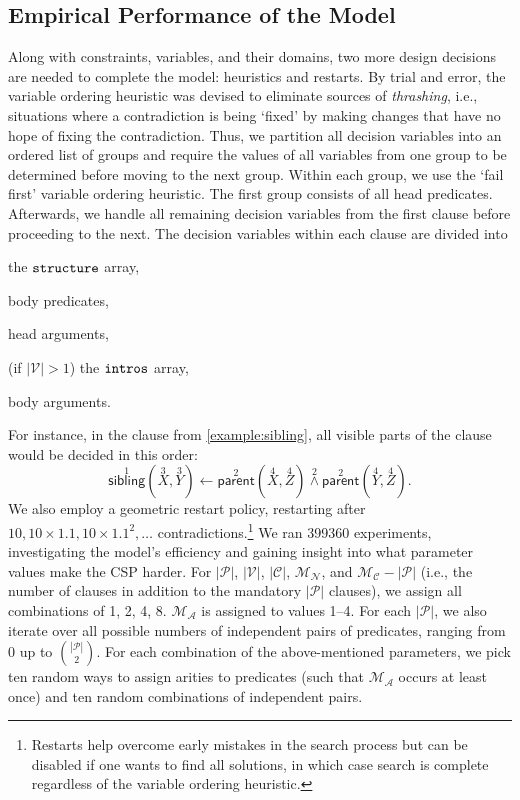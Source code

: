 \documentclass[runningheads]{llncs}
\newcommand{\variable}[1]{\texttt{\textup{#1}}}
\newcommand{\predicates}{\mathcal{P}}
\newcommand{\variables}{\mathcal{V}}
\newcommand{\constants}{\mathcal{C}}
\newcommand{\maxArity}{\mathcal{M}_{\mathcal{A}}}
\newcommand{\maxNumNodes}{\mathcal{M}_{\mathcal{N}}}
\newcommand{\maxNumClauses}{\mathcal{M}_{\mathcal{C}}}
\begin{document}
\subsection{Empirical Performance of the Model} \label{sec:experiment1}

Along with constraints, variables, and their domains, two more design decisions
are needed to complete the model: heuristics and restarts. By trial and error,
the variable ordering heuristic was devised to eliminate sources of
\emph{thrashing}, i.e., situations where a contradiction is being `fixed' by
making changes that have no hope of fixing the contradiction. Thus, we partition
all decision variables into an ordered list of groups and require the values of
all variables from one group to be determined before moving to the next group.
Within each group, we use the `fail first' variable ordering heuristic. The
first group consists of all head predicates. Afterwards, we handle all remaining
decision variables from the first clause before proceeding to the next. The
decision variables within each clause are divided into
\begin{enumerate*}[(a)]
\item the $\variable{structure}$ array,
\item body predicates,
\item head arguments,
\item (if $|\variables{}| > 1$) the $\variable{intros}$ array,
\item body arguments.
\end{enumerate*}
For instance, in the clause from \cref{example:sibling}, all visible parts of
the clause would be decided in this order:
\[
  \overset{1}{\mathsf{sibling}}(\overset{3}{X}, \overset{3}{Y}) \gets
  \overset{2}{\mathsf{parent}}(\overset{4}{X}, \overset{4}{Z})
  \overset{2}{\land} \overset{2}{\mathsf{parent}}(\overset{4}{Y},
  \overset{4}{Z}).
\]
We also employ a geometric restart policy, restarting after $10, 10 \times 1.1,
10 \times 1.1^2, \dots$ contradictions.\footnote{Restarts help overcome early
  mistakes in the search process but can be disabled if one wants to find all
  solutions, in which case search is complete regardless of the variable
  ordering heuristic.} We ran \num{399360} experiments, investigating the
model's efficiency and gaining insight into what parameter values make the CSP
harder. For $|\predicates{}|$, $|\variables{}|$, $|\constants{}|$,
$\maxNumNodes{}$, and $\maxNumClauses{} - |\predicates{}|$ (i.e., the number of
clauses in addition to the mandatory $|\predicates{}|$ clauses), we assign all
combinations of 1, 2, 4, 8. $\maxArity{}$ is assigned to values 1--4. For each
$|\predicates{}|$, we also iterate over all possible numbers of independent
pairs of predicates, ranging from 0 up to $\binom{|\predicates{}|}{2}$. For each
combination of the above-mentioned parameters, we pick ten random ways to assign
arities to predicates (such that $\maxArity{}$ occurs at least once) and ten
random combinations of independent pairs.
\end{document}

